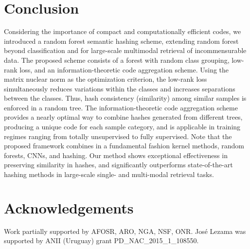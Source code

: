 \documentclass[runningheads]{llncs}
\begin{document}
\section{Conclusion} \label{sec:con}
Considering the importance of compact and computationally efficient codes, we
introduced a random forest semantic hashing scheme, 
 extending random forest  beyond classification
and for large-scale multimodal retrieval of incommensurable data.  The proposed
scheme consists of a forest with random class grouping, low-rank loss,  and an
information-theoretic code aggregation scheme.  Using the matrix nuclear norm as
the optimization criterion, the low-rank loss simultaneously reduces variations
within the classes and increases separations between the classes.  Thus, hash
consistency (similarity) among similar samples is enforced in a random tree.
The information-theoretic code aggregation scheme provides a nearly optimal way
to combine hashes generated from different trees, producing a unique code for
each sample category, and is applicable in training regimes ranging from totally
unsupervised to fully supervised.  Note that the proposed framework combines in
a fundamental fashion  kernel methods, random forests, CNNs, and
 hashing.  Our method shows exceptional effectiveness in
preserving similarity in hashes, and significantly outperforms state-of-the-art
hashing methods in large-scale single- and multi-modal retrieval tasks.

\section*{Acknowledgements}
Work partially supported by AFOSR, ARO, NGA, NSF, ONR. Jos\'e Lezama was supported by ANII (Uruguay) grant PD\_NAC\_2015\_1\_108550.



\end{document}
